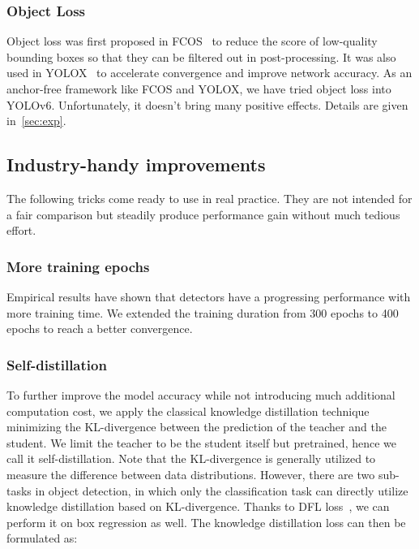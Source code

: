 \documentclass[10pt,twocolumn,letterpaper]{article}
\begin{document}
  \subsubsection{Object Loss}
  Object loss was first proposed in FCOS~\cite{tian2019fcos} to reduce the score of low-quality bounding boxes so that they can be filtered out in post-processing. 
It was also used in YOLOX~\cite{ge2021yolox} to accelerate convergence and improve network accuracy. As an anchor-free framework like FCOS and YOLOX, we have tried object loss into YOLOv6. Unfortunately, it doesn't bring many positive effects. Details are given in~\cref{sec:exp}.















  \subsection{Industry-handy improvements}
  \label{sec:method:further}
  The following tricks come ready to use in real practice. They are not intended for a fair comparison but steadily produce performance gain without much tedious effort.
   
  \subsubsection{More training epochs}
  Empirical results have shown that detectors have a progressing performance with more training time. We extended the training duration from 300 epochs to 400 epochs to reach a better convergence.

  
  
  
  \subsubsection{Self-distillation}
  To further improve the model accuracy while not introducing much additional computation cost, we apply the classical knowledge distillation technique minimizing the KL-divergence between the prediction of the teacher and the student. We limit the teacher to be the student itself but pretrained, hence we call it self-distillation. Note that the KL-divergence is generally utilized to measure the difference between data distributions. However, there are two sub-tasks in object detection, in which only the classification task can directly utilize knowledge distillation based on KL-divergence. Thanks to DFL loss~\cite{li2020generalized}, we can perform it on box regression as well. The knowledge distillation loss can then be formulated as: 
 
\end{document}
